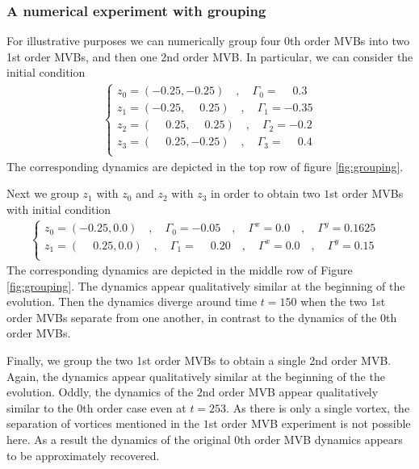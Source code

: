 \documentclass[12pt]{amsart}
\theoremstyle{remark}
\begin{document}
\subsubsection{A numerical experiment with grouping}
\label{sec:numerical_grouping}
For illustrative purposes we can numerically group four 0th order MVBs into two 1st order MVBs, and then one 2nd order MVB.
In particular, we can consider the initial condition
\begin{align}
	\begin{cases}
		z_0 = (-0.25,-0.25) \quad,\quad \Gamma_0 = \phantom{-}0.3 \\
		z_1 = (-0.25,\phantom{-}0.25) \quad,\quad \Gamma_1 = -0.35 \\
		z_2 = (\phantom{-}0.25,\phantom{-}0.25) \quad,\quad \Gamma_2 = -0.2 \\
		z_3 = (\phantom{-}0.25,-0.25) \quad,\quad \Gamma_3 = \phantom{-}0.4 \\		
	\end{cases}
	\label{eq:ic_0}
\end{align}
The corresponding dynamics are depicted in the top row of figure \ref{fig:grouping}.

Next we group $z_1$ with $z_0$ and $z_2$ with $z_3$ in order to obtain two $1$st order MVBs with initial condition
\begin{align}
	\begin{cases}
		z_0 = (-0.25,0.0) \quad,\quad \Gamma_0 = -0.05 \quad,\quad \Gamma^x = 0.0 \quad, \quad \Gamma^y = 0.1625\\
		z_1 = (\phantom{-}0.25,0.0) \quad,\quad \Gamma_1 = \phantom{-}0.20 \quad, \quad \Gamma^x = 0.0 \quad,\quad \Gamma^y = 0.15\phantom{00}\\
	\end{cases}
	\label{eq:ic_1}
\end{align}
The corresponding dynamics are depicted in the middle row of Figure \ref{fig:grouping}.
The dynamics appear qualitatively similar at the beginning of the evolution.
Then the dynamics diverge around time $t=150$ when the two $1$st order MVBs separate from one another, 
in contrast to the dynamics of the $0$th order MVBs.

Finally, we group the two 1st order MVBs to obtain a single 2nd order MVB.
Again, the dynamics appear qualitatively similar at the beginning of the the evolution.
Oddly, the dynamics of the $2$nd order MVB appear qualitatively similar to the $0$th
order case even at $t=253$.
As there is only a single vortex, the separation of vortices mentioned in the $1$st order
MVB experiment is not possible here.  As a result the dynamics of the original $0$th 
order MVB dynamics appears to be approximately recovered.
\end{document}
